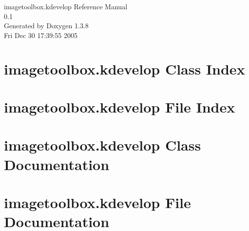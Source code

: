 \documentclass[a4paper]{book}
\begin{document}
\begin{titlepage}
\vspace*{7cm}
\begin{center}
{\Large imagetoolbox.kdevelop Reference Manual\\[1ex]\large 0.1 }\\
\vspace*{1cm}
{\large Generated by Doxygen 1.3.8}\\
\vspace*{0.5cm}
{\small Fri Dec 30 17:39:55 2005}\\
\end{center}
\end{titlepage}
\clearemptydoublepage
{}
\tableofcontents
\clearemptydoublepage
{}
\chapter{imagetoolbox.kdevelop Class Index}

\chapter{imagetoolbox.kdevelop File Index}

\chapter{imagetoolbox.kdevelop Class Documentation}

\chapter{imagetoolbox.kdevelop File Documentation}




\printindex
\end{document}
